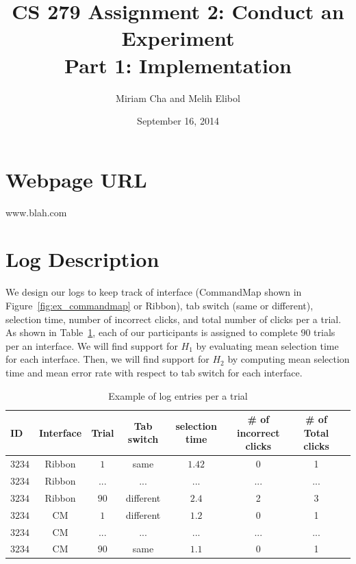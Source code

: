 \documentclass{article}
\title{CS 279 Assignment 2: Conduct an Experiment\\Part 1: Implementation}
\author{Miriam Cha and Melih Elibol}
\date{September 16, 2014}
\begin{document}
\maketitle

\section*{Webpage URL}
 www.blah.com
\section*{Log Description} 
 We design our logs to keep track of interface (CommandMap shown in Figure~\ref{fig:ex_commandmap} or Ribbon), tab switch (same or different),  selection time, number of incorrect clicks, and total number of clicks per a trial. As shown in Table~\ref{fig:trial_log}, each of our participants is assigned to complete $90$ trials per an interface. We will find support for $H_1$ by evaluating mean selection time for each interface. Then, we will find support for $H_2$ by computing mean selection time and mean error rate with respect to tab switch for each interface.  
 \begin{table}[tbh]
  \centering
\begin{tabular}{|l|c|c|c|c|c|c|c|}
  \hline
 ID &  Interface  &  Trial &  Tab switch & selection time & \# of incorrect clicks & \# of Total clicks              \\\hline
 $3234$ &   Ribbon  & $1$  & same  & $1.42$ & 0  &1 \\ \hline
$3234$  &    Ribbon &   $...$ & ...  & ... &  ... & ...\\\hline       
$3234$  &    Ribbon &   $90$ & different  & $2.4$ &2  &3 \\\hline      
$3234$  &    CM &   $1$ & different  & $1.2$ & 0 & 1 \\\hline   
$3234$  &    CM &   $...$ & ...  & ... &  ... & ...\\\hline   
$3234$  &    CM &   $90$ & same  & $1.1$ & 0 & 1 \\\hline  
\end{tabular}
\caption{Example of log entries per a trial}
\label{fig:trial_log}
\end{table}
\end{document}
